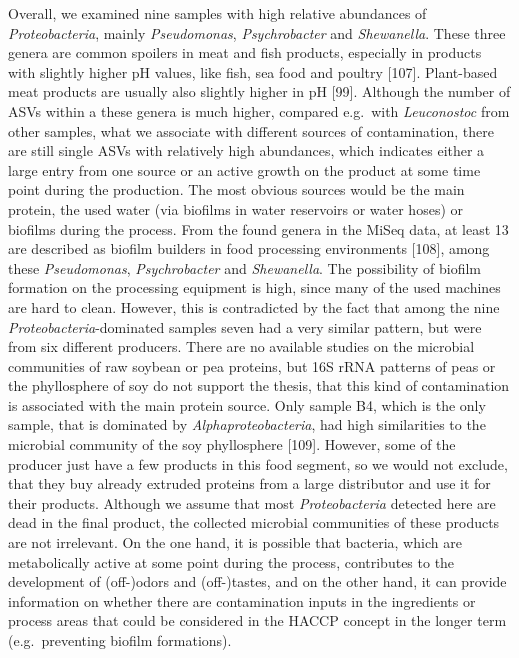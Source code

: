 \documentclass[preprint,3p,
a4paper]{elsarticle} %
\begin{document}
Overall, we examined nine samples with high relative abundances of
\emph{Proteobacteria}, mainly \emph{Pseudomonas}, \emph{Psychrobacter}
and \emph{Shewanella}. These three genera are common spoilers in meat
and fish products, especially in products with slightly higher pH
values, like fish, sea food and poultry {[}107{]}. Plant-based meat
products are usually also slightly higher in pH {[}99{]}. Although the
number of ASVs within a these genera is much higher, compared e.g.~with
\emph{Leuconostoc} from other samples, what we associate with different
sources of contamination, there are still single ASVs with relatively
high abundances, which indicates either a large entry from one source or
an active growth on the product at some time point during the
production. The most obvious sources would be the main protein, the used
water (via biofilms in water reservoirs or water hoses) or biofilms
during the process. From the found genera in the MiSeq data, at least 13
are described as biofilm builders in food processing environments
{[}108{]}, among these \emph{Pseudomonas}, \emph{Psychrobacter} and
\emph{Shewanella}. The possibility of biofilm formation on the
processing equipment is high, since many of the used machines are hard
to clean. However, this is contradicted by the fact that among the nine
\emph{Proteobacteria}-dominated samples seven had a very similar
pattern, but were from six different producers. There are no available
studies on the microbial communities of raw soybean or pea proteins, but
16S rRNA patterns of peas or the phyllosphere of soy do not support the
thesis, that this kind of contamination is associated with the main
protein source. Only sample B4, which is the only sample, that is
dominated by \emph{Alphaproteobacteria}, had high similarities to the
microbial community of the soy phyllosphere {[}109{]}. However, some of
the producer just have a few products in this food segment, so we would
not exclude, that they buy already extruded proteins from a large
distributor and use it for their products. Although we assume that most
\emph{Proteobacteria} detected here are dead in the final product, the
collected microbial communities of these products are not irrelevant. On
the one hand, it is possible that bacteria, which are metabolically
active at some point during the process, contributes to the development
of (off-)odors and (off-)tastes, and on the other hand, it can provide
information on whether there are contamination inputs in the ingredients
or process areas that could be considered in the HACCP concept in the
longer term (e.g.~preventing biofilm formations).
\end{document}
